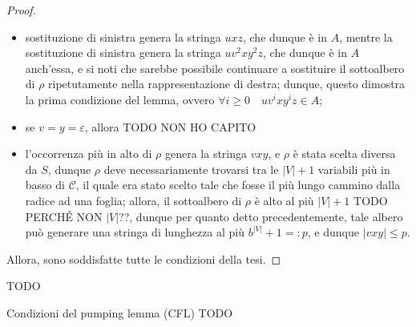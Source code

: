 \documentclass[a4paper, 12pt]{report}
\begin{document}
\begin{proof}
        \begin{itemize}
            \item sostituzione di sinistra genera la stringa $uxz$, che dunque è in $A$, mentre la sostituzione di sinistra genera la stringa $uv^2xy^2z$, che dunque è in $A$ anch'essa, e si noti che sarebbe possibile continuare a sostituire il sottoalbero di $\rho$ ripetutamente nella rappresentazione di destra; dunque, questo dimostra la prima condizione del lemma, ovvero $\forall i \ge 0 \quad uv^ixy^iz \in A$;
            \item se $v = y = \varepsilon$, allora TODO NON HO CAPITO
            \item l'occorrenza più in alto di $\rho$ genera la stringa $vxy$, e $\rho$ è stata scelta diversa da $S$, dunque $\rho$ deve necessariamente trovarsi tra le $|V| + 1$ variabili più in basso di $\mathscr{C}$, il quale era stato scelto tale che fosse il più lungo cammino dalla radice ad una foglia; allora, il sottoalbero di $\rho$ è alto al più $|V| + 1$ TODO PERCHÉ NON $|V|$??, dunque per quanto detto precedentemente, tale albero può generare una stringa di lunghezza al più $b^{|V|} + 1 =: p$, e dunque $|vxy| \le p$.
        \end{itemize}

        Allora, sono soddisfatte tutte le condizioni della tesi.
    \end{proof}

    \begin{example}
        TODO
    \end{example}

    \begin{framedobs}{Condizioni del pumping lemma (CFL)}
        TODO
    \end{framedobs}
\end{document}
